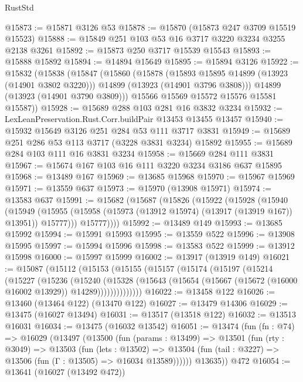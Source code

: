\begin{lexlean}{RustStd}
\begin{coremodule}
@15873 := @15871 @3126 @53
@15878 := @15870 (@15873 @247 @3709 @15519 @15523)
@15888 := @15849 @251 @103 @53 @16 @3717 @3220 @3234 @3255 @2138 @3261
@15892 := @15873 @250 @3717 @15539 @15543
@15893 := @15888 @15892
@15894 := @14894 @15649
@15895 := @15894 @3126
@15922 := @15832
    (@15838
      (@15847
        (@15860
          (@15878
            (@15893 @15895 @14899 (@13923 (@14901 @3802 @3220)))
            @14899
            (@13923 (@14901 @3796 @3808)))
          @14899
          (@13923 (@14901 @3790 @3809)))
        @15566
        @15569
        @15572
        @15576
        @15581
        @15587))
@15928 := @15689 @288 @103 @281 @16 @3832 @3234
@15932 := LexLeanPreservation.Rust.Corr.buildPair @13453 @13455 @13457
@15940 := @15932 @15649 @3126 @251 @284 @53 @111 @3717 @3831
@15949 := @15689 @251 @286 @53 @113 @3717 (@3228 @3831 @3234) @15892
@15955 := @15689 @284 @103 @111 @16 @3831 @3234
@15958 := @15669 @284 @111 @3831
@15967 := @15674 @167 @103 @16 @111 @3220 @3234 @3186 @637 @15895
@15968 := @13489 @167
@15969 := @13685 @15968
@15970 := @15967 @15969
@15971 := @13559 @637
@15973 := @15970 (@13908 @15971)
@15974 := @13583 @637
@15991 := @15682
    (@15687
      (@15826
        (@15922
          (@15928
            (@15940
              (@15949
                (@15955 (@15958 (@15973 (@13912 @15974) (@13917 (@13919 @167)) @13951)) @15777)))
            @15777))))
@15992 := @13489 @149
@15993 := @13685 @15992
@15994 := @15991 @15993
@15995 := @13559 @522
@15996 := @13908 @15995
@15997 := @15994 @15996
@15998 := @13583 @522
@15999 := @13912 @15998
@16000 := @15997 @15999
@16002 := @13917 (@13919 @149)
@16021 := @15087
    (@15112
      (@15153
        (@15155
          (@15157
            (@15174
              (@15197
                (@15214
                  (@15227
                    (@15236
                      (@15240
                        (@15328
                          (@15643
                            (@15654 (@15667 (@15672 (@16000 @16002 @13929)) @14289))))))))))))))
@16022 := @13458 @122
@16026 := @13460 (@13464 @122) (@13470 @122)
@16027 := @13479 @14306
@16029 := @13475 (@16027 @13494)
@16031 := @13517 (@13518 @122)
@16032 := @13513 @16031
@16034 := @13475 (@16032 @13542)
@16051 := @13474
    (fun (fn : @74) =>
    @16029
      (@13497
        (@13500
          (fun (params : @13499) =>
          @13501
            (fun (rty : @3049) =>
            @13503
              (fun (lets : @13502) =>
              @13504 (fun (tail : @3227) => @13506 (fun (Γ : @13505) => @16034 @13589))))))
        @13635))
    @472
@16054 := @13641 (@16027 (@13492 @472))

\end{coremodule}
\end{lexlean}
